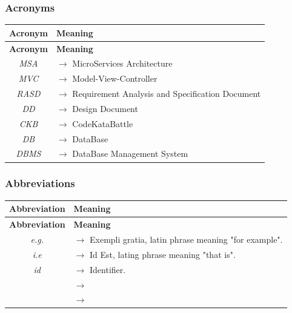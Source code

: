 \documentclass{article}
\begin{document}
{\subsubsection{Acronyms}
\begin{xltabular}{\textwidth}{ >{\raggedright\arraybackslash}c >{\raggedright\arraybackslash}X }
    \hline
    \textbf{Acronym} & \textbf{Meaning} \\
    \hline

    \endfirsthead

    \hline
    \textbf{Acronym} & \textbf{Meaning} \\
    \hline

    \endhead
    \endfoot
    \endlastfoot

    \textit{MSA} & $\rightarrow$ MicroServices Architecture\\
    \textit{MVC} & $\rightarrow$ Model-View-Controller\\
    \textit{RASD} & $\rightarrow$ Requirement Analysis and Specification Document\\
    \textit{DD} & $\rightarrow$ Design Document\\
    \textit{CKB} & $\rightarrow$ CodeKataBattle\\
    \textit{DB} & $\rightarrow$ DataBase \\
    \textit{DBMS} & $\rightarrow$ DataBase Management System

\end{xltabular}


\subsubsection{Abbreviations}
\begin{xltabular}{\textwidth}{ >{\raggedright\arraybackslash}c >{\raggedright\arraybackslash}X }
    \hline
    \textbf{Abbreviation} & \textbf{Meaning} \\
    \hline

    \endfirsthead

    \hline
    \textbf{Abbreviation} & \textbf{Meaning} \\
    \hline

    \endhead
    \endfoot
    \endlastfoot

    \textit{e.g.} & $\rightarrow$ Exempli gratia, latin phrase meaning "for example".
    \\
    \textit{i.e} & $\rightarrow$ Id Est, lating phrase meaning "that is".
    \\
    \textit{id} & $\rightarrow$ Identifier.
    \\
    \textit{} & $\rightarrow$
    \\
    \textit{} & $\rightarrow$
    \\
\end{xltabular}
}
\end{document}
